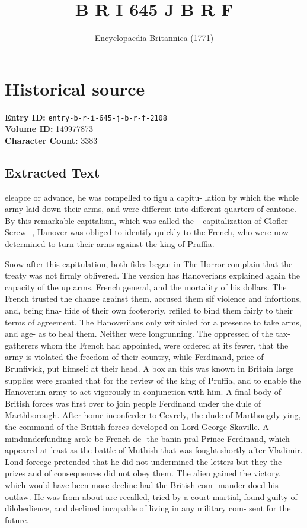 \documentclass{article}
\title{B R I  645 J B R F}
\date{Encyclopaedia Britannica (1771)}
\begin{document}
\maketitle

\section*{Historical source}
\textbf{Entry ID:} \texttt{entry-b-r-i-645-j-b-r-f-2108} \\
\textbf{Volume ID:} 149977873 \\
\textbf{Character Count:} 3383

\subsection*{Extracted Text}
eleapce or advance, he was compelled to figu a capitu- lation by which the whole army laid down their arms, and were different into different quarters of cantone. By this remarkable capitalism, which was called the \_capitalization of Clofler Screw\_, Hanover was obliged to identify quickly to the French, who were now determined to turn their arms against the king of Pruffia.

Snow after this capitulation, both fides began in The Horror complain that the treaty was not firmly oblivered. The version has Hanoverians explained again the capacity of the up arms. French general, and the mortality of his dollars. The French trusted the change against them, accused them sif violence and infortions, and, being fina- flide of their own footeroriy, refiled to bind them fairly to their terms of agreement. The Hanoveriians only withinled for a presence to take arms, and age- as to heal them. Neither were longrunning. The oppressed of the tax-gatherers whom the French had appointed, were ordered at its fewer, that the army is violated the freedom of their country, while Ferdinand, price of Brunfivick, put himself at their head. A box an this was known in Britain large supplies were granted that for the review of the king of Pruffia, and to enable the Hanoverian army to act vigorously in conjunction with him. A final body of British forces was first over to join people Ferdinand under the dule of Marthborough. After home inconferder to Cevrely, the dude of Marthongdy-ying, the command of the British forces developed on Lord George Skaville. A mindunderfunding arole be-French de- the banin pral Prince Ferdinand, which appeared at least as the battle of Muthish that was fought shortly after Vladimir. Lond forcege pretended that he did not undermined the letters but they the prizes and of consequences did not obey them. The alien gained the victory, which would have been more decline had the British com- mander-doed his outlaw. He was from about are recalled, tried by a court-martial, found guilty of dilobedience, and declined incapable of living in any military com- sent for the future.
\end{document}

